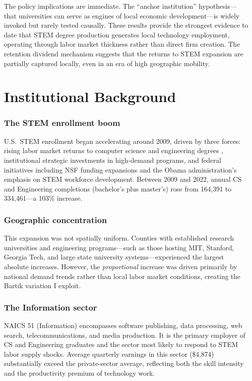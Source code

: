\documentclass[12pt]{article}
\begin{document}
The policy implications are immediate. The ``anchor institution'' hypothesis---that universities can serve as engines of local economic development---is widely invoked but rarely tested causally. These results provide the strongest evidence to date that STEM degree production generates local technology employment, operating through labor market thickness rather than direct firm creation. The retention dividend mechanism suggests that the returns to STEM expansion are partially captured locally, even in an era of high geographic mobility.

\section{Institutional Background}

\subsubsection*{The STEM enrollment boom} U.S.\ STEM enrollment began accelerating around 2009, driven by three forces: rising labor market returns to computer science and engineering degrees \citep{autor2014skills}, institutional strategic investments in high-demand programs, and federal initiatives including NSF funding expansions and the Obama administration's emphasis on STEM workforce development. Between 2009 and 2022, annual CS and Engineering completions (bachelor's plus master's) rose from 164,391 to 334,461---a 103\% increase.

\subsubsection*{Geographic concentration} This expansion was not spatially uniform. Counties with established research universities and engineering programs---such as those hosting MIT, Stanford, Georgia Tech, and large state university systems---experienced the largest absolute increases. However, the \textit{proportional} increase was driven primarily by national demand trends rather than local labor market conditions, creating the Bartik variation I exploit.

\subsubsection*{The Information sector} NAICS 51 (Information) encompasses software publishing, data processing, web search, telecommunications, and media production. It is the primary employer of CS and Engineering graduates and the sector most likely to respond to STEM labor supply shocks. Average quarterly earnings in this sector (\$4,874) substantially exceed the private-sector average, reflecting both the skill intensity and the productivity premium of technology work.
\end{document}
